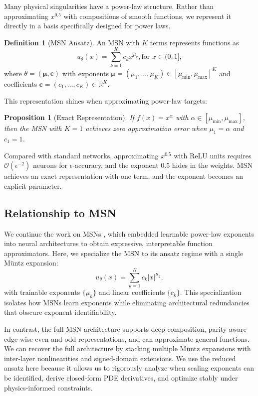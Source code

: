 \documentclass{article}
\theoremstyle{plain}
\newtheorem{proposition}[theorem]{Proposition}
\theoremstyle{definition}
\newtheorem{definition}[theorem]{Definition}
\theoremstyle{remark}
\newcommand{\R}{\mathbb{R}}
\newcommand{\mcO}{\mathcal{O}}
\newcommand{\bmu}{\bm{\mu}}
\newcommand{\bc}{\bm{c}}
\begin{document}
Many physical singularities have a power-law structure. Rather than approximating $x^{0.5}$ with compositions of smooth functions, we represent it directly in a basis specifically designed for power laws.
\begin{definition}[MSN Ansatz]
	\label{def:msn}
	An MSN with $K$ terms represents functions as
	\begin{equation}
		\label{eq:msn_ansatz}
		u_\theta(x) = \sum_{k=1}^{K} c_k x^{\mu_k}, \text{for } x \in (0, 1],
	\end{equation}
	where $\theta = (\bmu, \bc)$ with exponents $\bmu = (\mu_1, \ldots, \mu_K) \in [\mu_{\min}, \mu_{\max}]^K$ and coefficients $\bc = (c_1, \ldots, c_K) \in \R^K$.
\end{definition}

This representation shines when approximating power-law targets:
\begin{proposition}[Exact Representation]
	If $f(x) = x^\alpha$ with $\alpha \in [\mu_{\min}, \mu_{\max}]$, then the MSN with $K=1$ achieves zero approximation error when $\mu_1 = \alpha$ and $c_1 = 1$.
\end{proposition}
Compared with standard networks, approximating $x^{0.5}$ with ReLU units requires $\mcO(\epsilon^{-2})$ neurons for $\epsilon$-accuracy, and the exponent 0.5 hides in the weights. MSN achieves an exact representation with one term, and the exponent becomes an explicit parameter.

\subsection{Relationship to MSN}
\label{sec:relationship_msn}

We continue the work on MSNs \cite{nguessan2025msn}, which embedded learnable power-law exponents into neural architectures to obtain expressive, interpretable function approximators. Here, we specialize the MSN to its ansatz regime with a single M\"untz expansion:
\begin{equation}
	u_\theta(x) = \sum_{k=1}^{K} c_k |x|^{\mu_k},
\end{equation}
with trainable exponents $\{\mu_k\}$ and linear coefficients $\{c_k\}$. This specialization isolates how MSNs learn exponents while eliminating architectural redundancies that obscure exponent identifiability.

In contrast, the full MSN architecture supports deep composition, parity-aware edge-wise even and odd representations, and can approximate general functions. We can recover the full architecture by stacking multiple M\"untz expansions with inter-layer nonlinearities and signed-domain extensions. We use the reduced ansatz here because it allows us to rigorously analyze when scaling exponents can be identified, derive closed-form PDE derivatives, and optimize stably under physics-informed constraints.
\end{document}
